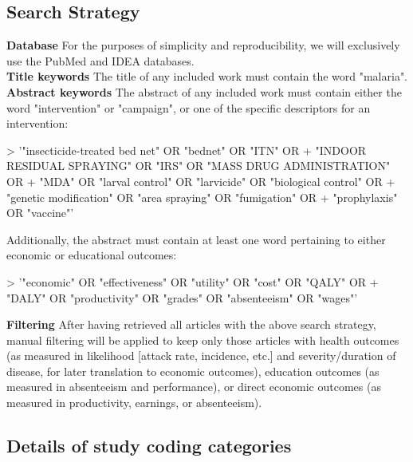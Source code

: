 \documentclass{article}
\begin{document}
\subsection*{Search Strategy}

\noindent \textbf{Database} For the purposes of simplicity and reproducibility, we will exclusively use the PubMed and IDEA databases. \\

\noindent \textbf{Title keywords} The title of any included work must contain the word "malaria". \\

\noindent \textbf{Abstract keywords} The abstract of any included work must contain either the word "intervention" or "campaign", or one of the specific descriptors for an intervention:  

\begin{Schunk}
\begin{Sinput}
> '"insecticide-treated bed net" OR "bednet" OR "ITN" OR 
+ "INDOOR RESIDUAL SPRAYING" OR "IRS" OR "MASS DRUG ADMINISTRATION" OR 
+ "MDA" OR "larval control" OR "larvicide" OR "biological control" OR 
+ "genetic modification" OR "area spraying" OR "fumigation" OR 
+ "prophylaxis" OR "vaccine"'
\end{Sinput}
\end{Schunk}

Additionally, the abstract must contain at least one word pertaining to either economic or educational outcomes:

\begin{Schunk}
\begin{Sinput}
> '"economic" OR "effectiveness" OR "utility" OR "cost" OR "QALY" OR 
+ "DALY" OR "productivity" OR "grades" OR "absenteeism" OR "wages"'
\end{Sinput}
\end{Schunk}


\noindent \textbf{Filtering} After having retrieved all articles with the above search strategy, manual filtering will be applied to keep only those articles with health outcomes (as measured in likelihood [attack rate, incidence, etc.] and severity/duration of disease, for later translation to economic outcomes), education outcomes (as measured in absenteeism and performance), or direct economic outcomes (as measured in productivity, earnings, or absenteeism).

\subsection*{Details of study coding categories} 
\end{document}
